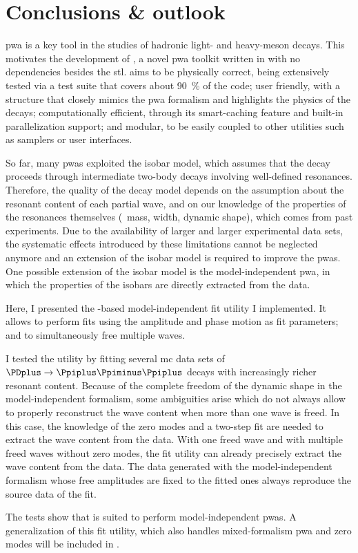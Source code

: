 \chapter{Conclusions \& outlook}

    \ac{pwa} is a key tool in the studies of hadronic light- and heavy-meson decays.
    This motivates the development of , a novel \ac{pwa} toolkit written in \cpp[14]{} with no dependencies besides the \ac{stl}.
     aims to be physically correct, being extensively tested via a test suite that covers about \SI{90}{\percent} of the code;
    user friendly, with a structure that closely mimics the \ac{pwa} formalism and highlights the physics of the decays;
    computationally efficient, through its smart-caching feature and built-in parallelization support;
    and modular, to be easily coupled to other utilities such as samplers or user interfaces.


    So far, many \acp{pwa} exploited the isobar model, which assumes that the decay proceeds through intermediate two-body decays involving well-defined resonances.
    Therefore, the quality of the decay model depends on the assumption about the resonant content of each partial wave, and on our knowledge of the properties of the resonances themselves (\eg~mass, width, dynamic shape), which comes from past experiments.
    Due to the availability of larger and larger experimental data sets, the systematic effects introduced by these limitations cannot be neglected anymore and an extension of the isobar model is required to improve the \acp{pwa}.
    One possible extension of the isobar model is the model-independent \ac{pwa}, in which the properties of the isobars are directly extracted from the data.

    
    Here, I presented the -based model-independent fit utility I implemented.
    It allows to perform fits using the amplitude and phase motion as fit parameters; and to simultaneously free multiple waves.


    I tested the utility by fitting several \ac{mc} data sets of $\PDplus\to\Ppiplus\Ppiminus\Ppiplus$ decays with increasingly richer resonant content.
    Because of the complete freedom of the dynamic shape in the model-independent formalism, some ambiguities arise which do not always allow to properly reconstruct the wave content when more than one wave is freed.
    In this case, the knowledge of the zero modes and a two-step fit are needed to extract the wave content from the data.
    With one freed wave and with multiple freed waves without zero modes, the fit utility can already precisely extract the wave content from the data.
    The data generated with the model-independent formalism whose free amplitudes are fixed to the fitted ones always reproduce the source data of the fit.


    The tests show that  is suited to perform model-independent \acp{pwa}.
    A generalization of this fit utility, which also handles mixed-formalism \ac{pwa} and zero modes will be included in .
